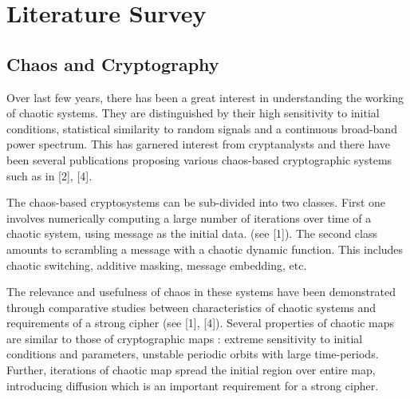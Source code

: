 \chapter{Literature Survey}
\label{chap:lit}
\setlength{\parskip}{1.5mm}
\section{Chaos and Cryptography}
Over last few years, there has been a great interest in understanding the working of chaotic systems. They are distinguished by their high sensitivity to initial conditions, statistical similarity to random signals and a continuous broad-band power spectrum. This has garnered interest from cryptanalysts and there have been several publications proposing various chaos-based cryptographic systems such as in [2], [4].

The chaos-based cryptosystems can be sub-divided into two classes. First one involves numerically computing a large number of iterations over time of a chaotic system, using message as the initial data. (see [1]). The second class amounts to scrambling a message with a chaotic dynamic function. This includes chaotic switching, additive masking, message embedding, etc.

The relevance and usefulness of chaos in these systems have been demonstrated through comparative studies between characteristics of chaotic systems and requirements of a strong cipher (see [1], [4]). Several properties of chaotic maps are similar to those of cryptographic maps : extreme sensitivity to initial conditions and parameters, unstable periodic orbits with large time-periods. Further, iterations of chaotic map spread the initial region over entire map, introducing diffusion which is an important requirement for a strong cipher.

